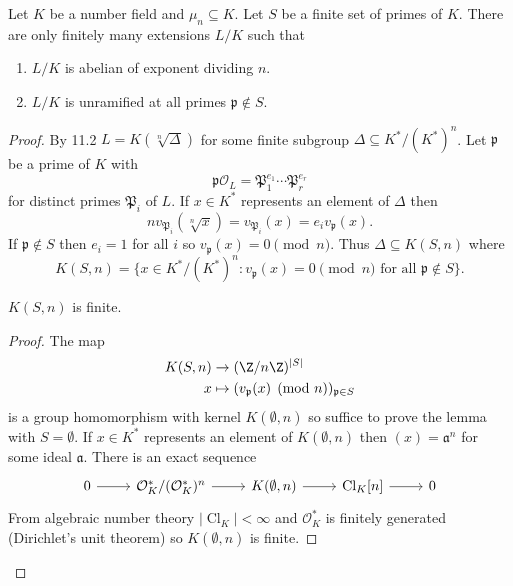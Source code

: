 \documentclass[a4paper]{article}
\theoremstyle{definition}
\renewcommand*{\O}{\mathcal{O}}
\DeclareMathOperator{\Cl}{Cl} %
\begin{document}
\begin{proposition}
  Let \(K\) be a number field and \(\mu_n \subseteq K\). Let \(S\) be a finite set of primes of \(K\). There are only finitely many extensions \(L/K\) such that
  \begin{enumerate}
  \item \(L/K\) is abelian of exponent dividing \(n\).
  \item \(L/K\) is unramified at all primes \(\mathfrak p \notin S\).
  \end{enumerate}
\end{proposition}

\begin{proof}
  By 11.2 \(L = K(\sqrt[n]{\Delta})\) for some finite subgroup \(\Delta \subseteq K^*/(K^*)^n\). Let \(\mathfrak p\) be a prime of \(K\) with
  \[
    \mathfrak p \O_L = \mathfrak P_1^{e_1} \cdots \mathfrak P_r^{e_r}
  \]
  for distinct primes \(\mathfrak P_i\) of \(L\). If \(x \in K^*\) represents an element of \(\Delta\) then
  \[
    n v_{\mathfrak P_i}(\sqrt[n]{x}) = v_{\mathfrak P_i}(x) = e_i v_{\mathfrak p}(x).
  \]
  If \(\mathfrak p \notin S\) then \(e_i = 1\) for all \(i\) so \(v_{\mathfrak p}(x) = 0 \pmod n\). Thus \(\Delta \subseteq K(S, n)\) where
  \[
    K(S, n) = \{x \in K^*/(K^*)^n: v_{\mathfrak p}(x) = 0 \pmod n \text{ for all } \mathfrak p \notin S\}.
  \]

  \begin{lemma}
    \(K(S, n)\) is finite.
  \end{lemma}

  \begin{proof}
    The map
    \begin{align*}
      K(S, n) &\to (\Z/n\Z)^{|S|} \\
      x &\mapsto (v_{\mathfrak p}(x) \pmod n)_{\mathfrak p \in S}
    \end{align*}
    is a group homomorphism with kernel \(K(\emptyset, n)\) so suffice to prove the lemma with \(S = \emptyset\). If \(x \in K^*\) represents an element of \(K(\emptyset, n)\) then \((x) = \mathfrak a^n\) for some ideal \(\mathfrak a\). There is an exact sequence
    \[
      \begin{tikzcd}
        0 \ar[r] & \O_K^*/(\O_K^*)^n \ar[r] & K(\emptyset, n) \ar[r] & \Cl_K[n] \ar[r] & 0
      \end{tikzcd}
    \]
    From algebraic number theory \(|\Cl_K| < \infty\) and \(\O_K^*\) is finitely generated (Dirichlet's unit theorem) so \(K(\emptyset, n)\) is finite.
  \end{proof}
\end{proof}
\end{document}
